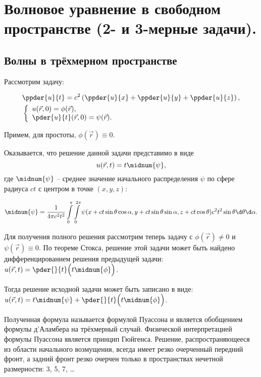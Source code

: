 \chapter{Волновое уравнение в свободном пространстве (2- и 3-мерные задачи).}

\section{Волны в трёхмерном пространстве}
Рассмотрим задачу:

\begin{minipage}{.33\textwidth}
    \begin{align*}
        & \ppder{u}{t} =
        c^2\left(\ppder{u}{x} + \ppder{u}{y} + \ppder{u}{z}\right), \\
        & \left\{ \begin{array}{l}
            u(\vec{r}, 0) = \phi(\vec{r}), \\
            \ds \pder{u}{t}(\vec{r}, 0) = \psi(\vec{r}).
        \end{array} \right.
    \end{align*}
\end{minipage}
\hfill
\begin{minipage}{.6\textwidth}
    Примем, для простоты, \( \phi(\vec{r}) \equiv 0 \).
    
    Оказывается, что решение данной задачи представимо в виде
    \[
        u(\vec{r}, t) = t\midnum{\psi},
    \]
    где \( \midnum{\psi} \) -- среднее значение начального распределения
    \( \psi \) по сфере радиуса \( ct \) с центром в точке \( (x, y, z) \):
\end{minipage}
\[
    \midnum{\psi} = \frac{1}{4\pi c^2t^2} \int\limits_0^\pi
    \int\limits_0^{2\pi} \psi(x + ct\sin\theta\cos\alpha, y + ct\sin\theta
    \sin\alpha, z + ct\cos\theta)c^2t^2\sin\theta\d\theta\d\alpha.
\]

Для получения полного решения рассмотрим теперь задачу с
\( \phi(\vec{r}) \neq 0 \) и \( \psi(\vec{r}) \equiv 0 \). По теореме Стокса,
решение этой задачи может быть найдено дифференцированием решения предыдущей
задачи: \( \ds u(\vec{r}, t) = \pder{}{t}\Bigl(t\midnum{\phi}\Bigr) \).

Тогда решение исходной задачи может быть записано в виде:
\( \ds u(\vec{r}, t) = t\midnum{\psi} + \pder{}{t}\Bigl(t\midnum{\phi}\Bigr) \).

Полученная формула называется формулой Пуассона и является обобщением формулы
д'Аламбера на трёхмерный случай. Физической интерпретацией формулы Пуассона
является принцип Гюйгенса. Решение, распространяющееся из области начального
возмущения, всегда имеет резко очерченный передний фронт, а задний фронт резко
очерчен только в пространствах нечетной размерности: 3, 5, 7, \ldots

